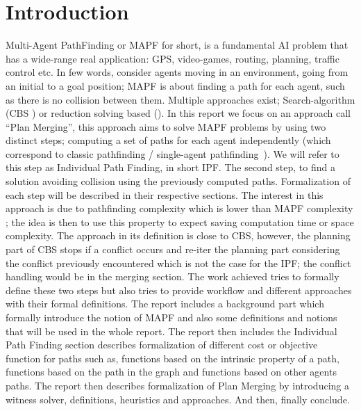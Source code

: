 \section{Introduction}
Multi-Agent PathFinding or MAPF \cite{ststfekomawaliatcokubabo19a,ststfekomawaliatcokubabo19b,stern19a} for short, is a fundamental AI problem that has a wide-range real application: GPS, video-games, routing, planning, traffic control etc. In few words, consider agents moving in an environment, going from an initial to a goal position; MAPF is about finding a path for each agent, such as there is no collision between them. Multiple approaches exist; Search-algorithm (CBS \cite{shstfest15a}) or reduction solving based (\cite{barsva19a}). 
In this report we focus on an approach call ``Plan Merging'', this approach aims to solve MAPF problems by using two distinct steps; computing a set of paths for each agent independently (which correspond to classic pathfinding / single-agent pathfinding~\cite{foghkuhagu21a}). We will refer to this step as Individual Path Finding, in short IPF. The second step, to find a solution avoiding collision using the previously computed paths. Formalization of each step will be described in their respective sections. The interest in this approach is due to pathfinding complexity which is lower than MAPF complexity \cite{nebel19a}; the idea is then to use this property to expect saving computation time or space complexity. 
The approach in its definition is close to CBS, however, the planning part of CBS stops if a conflict occurs and re-iter the planning part considering the conflict previously encountered which is not the case for the IPF; the conflict handling would be in the merging section.
The work achieved tries to formally define these two steps but also tries to provide workflow and different approaches with their formal definitions. The report includes a background part which formally introduce the notion of MAPF and also some definitions and notions that will be used in the whole report. The report then includes the Individual Path Finding section describes formalization of different cost or objective function for paths such as, functions based on the intrinsic property of a path, functions based on the path in the graph and functions based on other agents paths. The report then describes formalization of Plan Merging by introducing a witness solver, definitions, heuristics and approaches. And then, finally conclude. 

